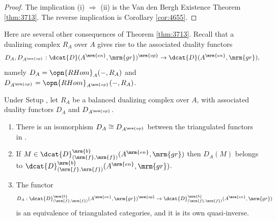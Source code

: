 \begin{proof}
The implication (i) $\Rightarrow$ (ii) is the Van den Bergh Existence 
Theorem \ref{thm:3713}. 
The reverse implication is Corollary \ref{cor:4655}.
\end{proof}

Here are several other consequences of Theorem \ref{thm:3713}. 
Recall that a dualizing complex $R_A$ over $A$ gives rise to the 
associated duality functors 
\begin{equation} \label{eqn:5100}
D_A, D_{A^{\mrm{op}}} : \dcat{D}(A^{\mrm{en}}, \mrm{gr})^{\mrm{op}} \to
\dcat{D}(A^{\mrm{en}}, \mrm{gr}) ,
\end{equation}
namely 
$D_A = \opn{RHom}_{A}(-, R_A)$ and 
$D_{A^{\mrm{op}}} = \opn{RHom}_{A^{\mrm{op}}}(-, R_A)$.

\begin{thm} \label{thm:4055} 
Under Setup \tup{\ref{setup:3925}}, let $R_A$ be a balanced dualizing complex 
over $A$, with associated duality 
functors $D_A$ and $D_{A^{\mrm{op}}}$.
\begin{enumerate}
\item There is an isomorphism 
$D_A \cong D_{A^{\mrm{op}}}$
between the triangulated functors in \tup{(\ref{eqn:5100})}.
 
\item If 
$M \in \dcat{D}^{\mrm{b}}_{(\mrm{f}, \mrm{f})}(A^{\mrm{en}}, \mrm{gr})$
then $D_A(M)$ belongs to  
$\dcat{D}^{\mrm{b}}_{(\mrm{f}, \mrm{f})}(A^{\mrm{en}}, \mrm{gr})$.

\item The functor 
\[ D_A : \dcat{D}^{\mrm{b}}_{(\mrm{f}, \mrm{f})}(A^{\mrm{en}}, 
\mrm{gr})^{\mrm{op}} \to
\dcat{D}^{\mrm{b}}_{(\mrm{f}, \mrm{f})}(A^{\mrm{en}}, \mrm{gr}) \]
is an equivalence of triangulated categories, and it is its own quasi-inverse. 
\end{enumerate}
\end{thm}

